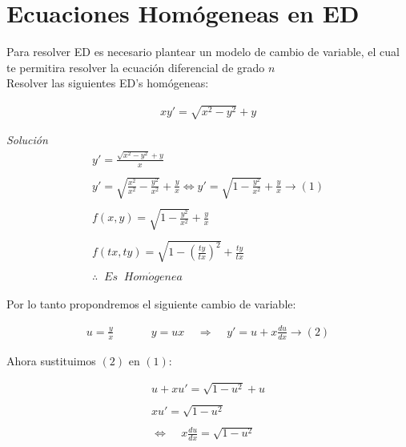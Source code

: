 \section{Ecuaciones Homógeneas en ED}

Para resolver ED es necesario plantear un modelo de cambio de variable, el cual te permitira resolver la ecuación diferencial de grado \(\displaystyle n\)\\

Resolver las siguientes ED's homógeneas:

\begin{equation}
    \begin{gathered}
        xy'=\sqrt{x^{2}-y^{2}}+y
    \end{gathered}
\end{equation}

\textit{Solución}
\begin{equation*}
    \begin{gathered}
        y'=\frac{\sqrt{x^{2}-y^{2}}+y}{x}\\\\
        y'=\sqrt{\frac{x^{2}}{x^{2}}-\frac{y^{2}}{x^{2}}}+\frac{y}{x}
        \Leftrightarrow y'=\sqrt{1-\frac{y^{2}}{x^{2}}}+\frac{y}{x}\rightarrow (1)\\\\
        f(x,y)=\sqrt{1-\frac{y^{2}}{x^{2}}}+\frac{y}{x}\\\\
        f(tx,ty)=\sqrt{1-\left(\frac{ty}{tx}\right)^{2}}+\frac{ty}{tx}\\\\
        \therefore\;\;Es\;\;Hom\acute{o}genea
    \end{gathered}
\end{equation*}

Por lo tanto propondremos el siguiente cambio de variable:

\begin{equation*}
    \begin{gathered}
        u=\frac{y}{x}\;\;\;\;\;\;\;\;\;\;\;\;y=ux\;\;\;\;\Rightarrow\;\;\;\;y'=u+x\frac{du}{dx}\rightarrow(2)
    \end{gathered}
\end{equation*}

Ahora sustituimos \(\displaystyle (2)\) en \(\displaystyle (1)\):

\begin{equation*}
    \begin{gathered}
        u+xu'=\sqrt{1-u^{2}}+u\\\\
        xu'=\sqrt{1-u^{2}}\\\\
        \Leftrightarrow\;\;\;\;x\frac{du}{dx}=\sqrt{1-u^{2}}
    \end{gathered}
\end{equation*}

